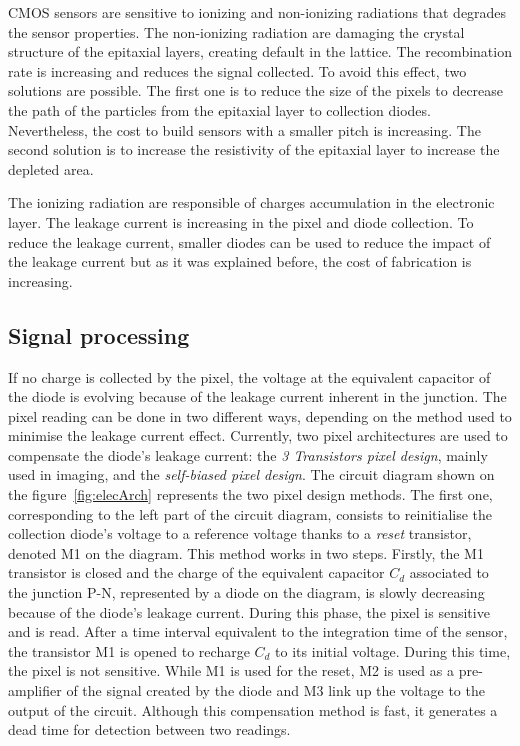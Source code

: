     CMOS sensors are sensitive to ionizing and non-ionizing radiations that degrades the sensor properties.
    The non-ionizing radiation are damaging the crystal structure of the epitaxial layers, creating default in the lattice.
    The recombination rate is increasing and reduces the signal collected.
    To avoid this effect, two solutions are possible.
    The first one is to reduce the size of the pixels to decrease the path of the particles from the epitaxial layer to collection diodes.
    Nevertheless, the cost to build sensors with a smaller pitch is increasing.
    The second solution is to increase the resistivity of the epitaxial layer to increase the depleted area.
    
    The ionizing radiation are responsible of charges accumulation in the electronic layer.
    The leakage current is increasing in the pixel and diode collection.
    To reduce the leakage current, smaller diodes can be used to reduce the impact of the leakage current but as it was explained before, the cost of fabrication is increasing.
    
    \subsection{Signal processing}

    If no charge is collected by the pixel, the voltage at the equivalent capacitor of the diode is evolving because of the leakage current inherent in the junction.
    The pixel reading can be done in two different ways, depending on the method used to minimise the leakage current effect.
    Currently, two pixel architectures are used to compensate the diode's leakage current: the \textit{3 Transistors pixel design}, mainly used in imaging, and the \textit{self-biased pixel design}.
    The circuit diagram shown on the figure~\ref{fig:elecArch} represents the two pixel design methods.
    The first one, corresponding to the left part of the circuit diagram, consists to reinitialise the collection diode's voltage to a reference voltage thanks to a \textit{reset} transistor, denoted M1 on the diagram.
    This method works in two steps. 
    Firstly, the M1 transistor is closed and the charge of the equivalent capacitor $C_d$ associated to the junction P-N, represented by a diode on the diagram, is slowly decreasing because of the diode's leakage current. 
    During this phase, the pixel is sensitive and is read.
    After a time interval equivalent to the integration time of the sensor, the transistor M1 is opened to recharge $C_d$ to its initial voltage.
    During this time, the pixel is not sensitive.
    While M1 is used for the reset, M2 is used as a pre-amplifier of the signal created by the diode and M3 link up the voltage to the output of the circuit.
    Although this compensation method is fast, it generates a dead time for detection between two readings.
    
